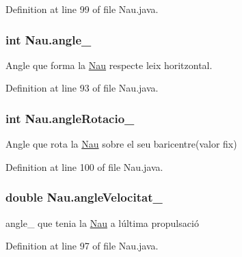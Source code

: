 Definition at line 99 of file Nau.\+java.

\hypertarget{class_nau_a7bdee12f00bd2087872ff3018144799e}{}
\subsubsection[{angle\+\_\+}]{\setlength{\rightskip}{0pt plus 5cm}int Nau.\+angle\+\_\+\hspace{0.3cm}{\ttfamily [protected]}}\label{class_nau_a7bdee12f00bd2087872ff3018144799e}


Angle que forma la \hyperlink{class_nau}{Nau} respecte l\textquotesingle{}eix horitzontal. 



Definition at line 93 of file Nau.\+java.

\hypertarget{class_nau_a4a3defe435bcea8864ff9025c740695a}{}
\subsubsection[{angle\+Rotacio\+\_\+}]{\setlength{\rightskip}{0pt plus 5cm}int Nau.\+angle\+Rotacio\+\_\+\hspace{0.3cm}{\ttfamily [private]}}\label{class_nau_a4a3defe435bcea8864ff9025c740695a}


Angle que rota la \hyperlink{class_nau}{Nau} sobre el seu baricentre(valor fix) 



Definition at line 100 of file Nau.\+java.

\hypertarget{class_nau_aa2ee3693a5f2a95449e0310f34d9fad4}{}
\subsubsection[{angle\+Velocitat\+\_\+}]{\setlength{\rightskip}{0pt plus 5cm}double Nau.\+angle\+Velocitat\+\_\+\hspace{0.3cm}{\ttfamily [protected]}}\label{class_nau_aa2ee3693a5f2a95449e0310f34d9fad4}


angle\+\_\+ que tenia la \hyperlink{class_nau}{Nau} a l\textquotesingle{}última propulsació 



Definition at line 97 of file Nau.\+java.

